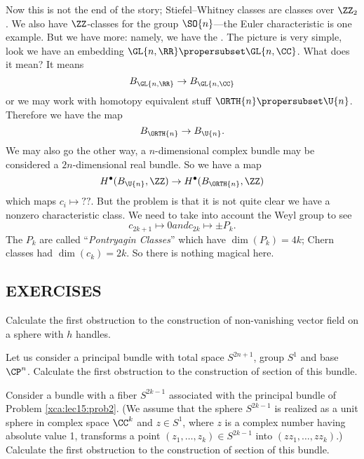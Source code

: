 Now this is not the end of the story; Stiefel--Whitney classes
are classes over $\ZZ_2$. We also have $\ZZ$-classes for the
group $\SO{n}$---the Euler characteristic is one example. But we
have more: namely, we have the .
The picture is very simple, look we have an embedding
$\GL{n,\RR}\propersubset\GL{n,\CC}$. What does it mean? It means
\begin{equation}
B_{\GL{n,\RR}}\to B_{\GL{n,\CC}}
\end{equation}
or we may work with homotopy equivalent stuff
$\ORTH{n}\propersubset\U{n}$. Therefore we have the map
\begin{equation}
B_{\ORTH{n}}\to B_{\U{n}}.
\end{equation}
We may also go the other way, a $n$-dimensional complex bundle
may be considered a  $2n$-dimensional real bundle. So we have a
map
\begin{equation}
H^{\bullet}(B_{\U{n}},\ZZ)\to H^{\bullet}(B_{\ORTH{n}},\ZZ)
\end{equation}
which maps $c_{i}\mapsto\textbf{??}$. But the problem is that it is not
quite clear we have a nonzero characteristic class. We need to
take into account the Weyl group to see 
\begin{subequations}
\begin{equation}
c_{2k+1}\mapsto 0
\end{equation}
and
\begin{equation}
c_{2k}\mapsto\pm P_{k}.
\end{equation}
\end{subequations}
The $P_{k}$ are called ``\emph{Pontryagin Classes\/}'' which have
$\dim(P_{k})=4k$; Chern classes had $\dim(c_{k})=2k$. So there is
nothing magical here.

\subsection*{EXERCISES}
\begin{xca}
Calculate the first obstruction to the construction of non-vanishing vector field on a sphere with $h$ handles.
\end{xca}
\begin{xca}\label{xca:lec15:prob2}
Let us consider a principal bundle with total space $S^{2n+1}$, group $S^1$ and base $\CP^n$. Calculate the first obstruction to the construction of section of this bundle.
\end{xca}
\begin{xca}
Consider a bundle with a fiber $S^{2k-1}$ associated with the principal bundle of Problem \ref{xca:lec15:prob2}. (We assume that the sphere $S^{2k-1}$ is realized as a unit sphere in complex space $\CC^k$ and $z\in S^1$, where $z$ is a complex number having absolute value 1, transforms a point $(z_1, \dots, z_k)\in S^{2k-1}$ into $(zz_1, \dots, zz_k)$.) Calculate the first obstruction to the construction of section of this bundle.
\end{xca}
